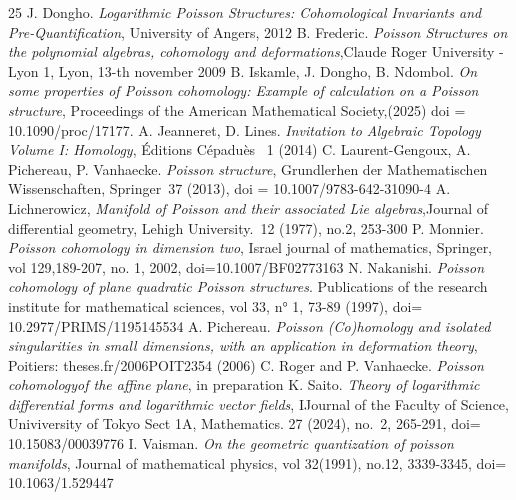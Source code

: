 \documentclass[a4paper, 12pt,oneside,reqno]{amsart}
\theoremstyle{definition}
\begin{document}
\begin{thebibliography}{25}
%
	 J. Dongho. {\it Logarithmic Poisson Structures: Cohomological Invariants and Pre-Quantification}, University of Angers, 2012
	 B. Frederic. {\it Poisson Structures on the polynomial algebras, cohomology and deformations},Claude Roger University - Lyon 1, Lyon, 13-th november 2009
	 B. Iskamle, J. Dongho, B. Ndombol. {\it On some properties of Poisson cohomology: Example of calculation on a Poisson structure}, Proceedings  of the American Mathematical Society,(2025) doi	= 10.1090/proc/17177.
	 A. Jeanneret,  D. Lines. {\it Invitation to Algebraic Topology Volume I: Homology}, \'{E}ditions C\'{e}padu\`{e}s~ 1 (2014) 
	 C. Laurent-Gengoux, A. Pichereau, P. Vanhaecke. {\it Poisson structure}, Grundlerhen der Mathematischen Wissenschaften, Springer~37 (2013), doi	= 10.1007/9783-642-31090-4
	 A. Lichnerowicz, {\it Manifold of Poisson and their associated Lie algebras},Journal of differential geometry, Lehigh University.~12 (1977), no.2, 253-300
	 P. Monnier. {\it Poisson cohomology in dimension two}, Israel journal of mathematics, Springer, vol 129,189-207, no. 1, 2002, doi=10.1007/BF02773163
	 N. Nakanishi. {\it Poisson cohomology of plane quadratic Poisson structures}. Publications of the research institute for mathematical sciences,  vol 33, n° 1, 73-89  (1997), 	       doi= 10.2977/PRIMS/1195145534
	 A. Pichereau. {\it Poisson (Co)homology and isolated singularities in small dimensions, with an application in deformation theory}, Poitiers: theses.fr/2006POIT2354 (2006)
	 C. Roger and P. Vanhaecke. {\it Poisson cohomologyof the affine plane}, in preparation
	 K. Saito. {\it Theory of logarithmic differential forms and logarithmic vector fields}, IJournal of the Faculty of Science, Univiversity of Tokyo Sect 1A, Mathematics. 27 (2024), no.~2, 265-291, 	  doi= 10.15083/00039776
	 I. Vaisman. {\it On the geometric quantization of poisson manifolds}, Journal of mathematical physics, vol 32(1991), no.12, 3339-3345, 	  doi= 10.1063/1.529447
	\end{thebibliography}
\end{document}
